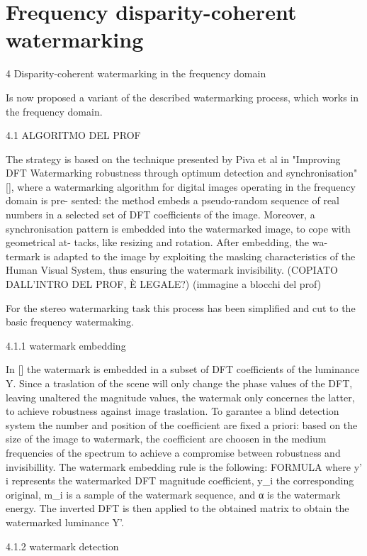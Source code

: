 \chapter{Frequency disparity-coherent watermarking}
\label{dft}

 4 Disparity-coherent watermarking in the frequency domain

 Is now proposed a variant of the described watermarking process, which works in the frequency domain.

4.1 ALGORITMO DEL PROF

 The strategy is based on the technique presented by Piva et al in "Improving DFT Watermarking robustness through optimum
detection and synchronisation" [], where a watermarking algorithm
for digital images operating in the frequency domain is pre-
sented: the method embeds a pseudo-random sequence of
real numbers in a selected set of DFT coefficients of the
image. Moreover, a synchronisation pattern is embedded
into the watermarked image, to cope with geometrical at-
tacks, like resizing and rotation. After embedding, the wa-
termark is adapted to the image by exploiting the masking
characteristics of the Human Visual System, thus ensuring
the watermark invisibility. (COPIATO DALL'INTRO DEL PROF, È LEGALE?)
(immagine a blocchi del prof)

For the stereo watermarking task this process has been simplified and cut to the basic frequency watermaking.

4.1.1 watermark embedding

In [] the watermark is embedded in a subset of DFT coefficients of the luminance Y. Since a traslation of the scene will only change the phase values of the DFT, leaving unaltered the magnitude values, the watermak only concernes the latter, to achieve robustness against image traslation.
To garantee a blind detection system the number and position of the coefficient are fixed a priori: based on the size of the image to watermark, the coefficient are choosen in the medium frequencies of the spectrum to achieve a compromise between robustness and invisibillity. 
The watermark embedding rule is the following:
FORMULA
where y’ i represents the watermarked DFT magnitude coefficient, y_i the corresponding original, m_i is a sample of the watermark sequence, and α is the watermark energy.
The inverted DFT is then applied to the obtained matrix to obtain the watermarked luminance Y'.


4.1.2 watermark detection

